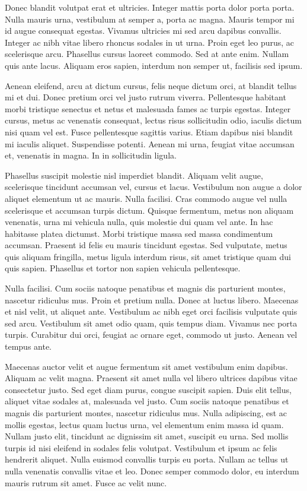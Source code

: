 Donec blandit volutpat erat et ultricies. Integer mattis porta dolor
porta porta. Nulla mauris urna, vestibulum at semper a, porta ac magna.
Mauris tempor mi id augue consequat egestas. Vivamus ultricies mi
sed arcu dapibus convallis. Integer ac nibh vitae libero rhoncus sodales
in ut urna. Proin eget leo purus, ac scelerisque arcu. Phasellus cursus
laoreet commodo. Sed at ante enim. Nullam quis ante lacus. Aliquam
eros sapien, interdum non semper ut, facilisis sed ipsum.

Aenean eleifend, arcu at dictum cursus, felis neque dictum orci, at
blandit tellus mi et dui. Donec pretium orci vel justo rutrum viverra.
Pellentesque habitant morbi tristique senectus et netus et malesuada
fames ac turpis egestas. Integer cursus, metus ac venenatis consequat,
lectus risus sollicitudin odio, iaculis dictum nisi quam vel est.
Fusce pellentesque sagittis varius. Etiam dapibus nisi blandit mi
iaculis aliquet. Suspendisse potenti. Aenean mi urna, feugiat vitae
accumsan et, venenatis in magna. In in sollicitudin ligula.

Phasellus suscipit molestie nisl imperdiet blandit. Aliquam velit
augue, scelerisque tincidunt accumsan vel, cursus et lacus. Vestibulum
non augue a dolor aliquet elementum ut ac mauris. Nulla facilisi.
Cras commodo augue vel nulla scelerisque et accumsan turpis dictum.
Quisque fermentum, metus non aliquam venenatis, urna mi vehicula nulla,
quis molestie dui quam vel ante. In hac habitasse platea dictumst.
Morbi tristique massa sed massa condimentum accumsan. Praesent id
felis eu mauris tincidunt egestas. Sed vulputate, metus quis aliquam
fringilla, metus ligula interdum risus, sit amet tristique quam dui
quis sapien. Phasellus et tortor non sapien vehicula pellentesque.

Nulla facilisi. Cum sociis natoque penatibus et magnis dis parturient
montes, nascetur ridiculus mus. Proin et pretium nulla. Donec at luctus
libero. Maecenas et nisl velit, ut aliquet ante. Vestibulum ac nibh
eget orci facilisis vulputate quis sed arcu. Vestibulum sit amet odio
quam, quis tempus diam. Vivamus nec porta turpis. Curabitur dui orci,
feugiat ac ornare eget, commodo ut justo. Aenean vel tempus ante.

Maecenas auctor velit et augue fermentum sit amet vestibulum enim
dapibus. Aliquam ac velit magna. Praesent sit amet nulla vel libero
ultrices dapibus vitae consectetur justo. Sed eget diam purus, congue
suscipit sapien. Duis elit tellus, aliquet vitae sodales at, malesuada
vel justo. Cum sociis natoque penatibus et magnis dis parturient montes,
nascetur ridiculus mus. Nulla adipiscing, est ac mollis egestas, lectus
quam luctus urna, vel elementum enim massa id quam. Nullam justo elit,
tincidunt ac dignissim sit amet, suscipit eu urna. Sed mollis turpis
id nisi eleifend in sodales felis volutpat. Vestibulum et ipsum ac
felis hendrerit aliquet. Nulla euismod convallis turpis eu porta.
Nullam ac tellus ut nulla venenatis convallis vitae et leo. Donec
semper commodo dolor, eu interdum mauris rutrum sit amet. Fusce ac
velit nunc.

